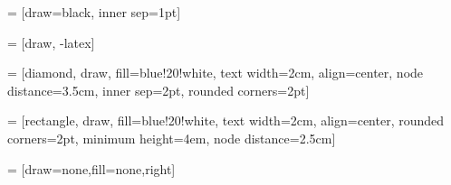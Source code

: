 \usepackage{tikz}
\usetikzlibrary{shapes,decorations,arrows}
\usetikzlibrary{positioning}

\usepackage{xcolor} %

 = [draw=black, inner sep=1pt]
\newlength{\fnodewidth} %
\setlength{\fnodewidth}{6cm}

 = [draw, -latex]

 = [diamond, draw, fill=blue!20!white, text width=2cm,
    align=center, node distance=3.5cm, inner sep=2pt, rounded corners=2pt]

 = [rectangle, draw, fill=blue!20!white, text width=2cm,
    align=center, rounded corners=2pt, minimum height=4em,
    node distance=2.5cm]
    
 = [draw=none,fill=none,right]

%
%
%
\newcommand{\funcnode}[4]{
    \node [funcnode, #1] (#2) {
        \begin{minipage}{\fnodewidth}
            \begin{tabular}{l}
                \rowcolor[gray]{0.8}
                \begin{minipage}[c]{\textwidth - 2\tabcolsep}
                    \singlespacing
                    \begin{center}
                        \vspace{-\baselineskip}
                        \textbf{#3}
                    \end{center}
                \end{minipage}\\
                \begin{minipage}[c]{\textwidth - 2\tabcolsep}
                    \singlespacing
                    \begin{minipage}[c]{\textwidth - 2\tabcolsep}
                    #4
                    \end{minipage}
                    \vspace{0.5\baselineskip}\\
                \end{minipage}\\
            \end{tabular}
        \end{minipage}
    } %
} %
